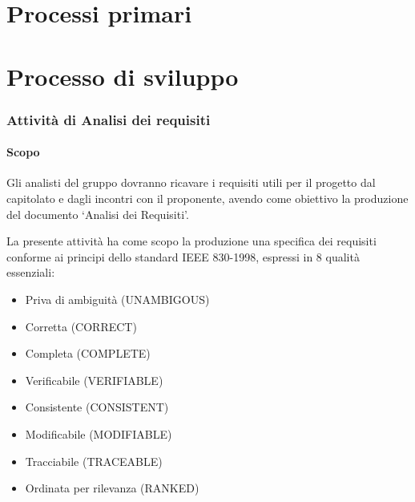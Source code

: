 

\section{Processi primari}
	\section{Processo di sviluppo}
		\subsubsection{Attività di Analisi dei requisiti}
			\paragraph*{Scopo}
				Gli analisti del gruppo dovranno ricavare i requisiti utili per il progetto
				dal capitolato e dagli incontri con il proponente, avendo come obiettivo la
				produzione del documento `Analisi dei Requisiti'.
			
			La presente attività ha come scopo la produzione una specifica dei
			requisiti conforme ai principi dello standard IEEE 830-1998, espressi in 8 qualit\`a
			essenziali:
				\begin{itemize}
				\item Priva di ambiguit\`a (UNAMBIGOUS)
				\item Corretta (CORRECT)
				\item Completa (COMPLETE)
				\item Verificabile (VERIFIABLE)
				\item Consistente (CONSISTENT)
				\item Modificabile (MODIFIABLE)
				\item Tracciabile (TRACEABLE)
				\item Ordinata per rilevanza (RANKED)
				\end{itemize}
			
